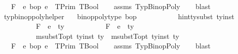 \begin{isabellebody}
\ \ \ {\isachardoublequoteopen}F{\isacharcomma}{\kern0pt}{\isasymDelta}\ {\isasymturnstile}\ e{}\ {\isasymguillemotleft}bop{\isasymguillemotright}\ e{}\ {\isacharcolon}{\kern0pt}\ TPrim\ {\isacharparenleft}{\kern0pt}TBool{\isacharparenright}{\kern0pt}{\isachardoublequoteclose}\isanewline
%
\isadelimproof
\ \ %
\endisadelimproof
%
\isatagproof
{}\isamarkupfalse%
\ assms\ TypBinopPoly\isanewline
\ \ \isamarkupfalse%
\ blast%
\endisatagproof
{\isafoldproof}%
%
\isadelimproof
\isanewline
%
\endisadelimproof
\isanewline
{}\isamarkupfalse%
\ typ{\isacharunderscore}{\kern0pt}binop{\isacharunderscore}{\kern0pt}poly{\isacharunderscore}{\kern0pt}helper{\isacharunderscore}{\kern0pt}{}{\isacharcolon}{\kern0pt}\isanewline
\ \ \ {\isachardoublequoteopen}binop{\isacharunderscore}{\kern0pt}poly{\isacharunderscore}{\kern0pt}type\ bop{\isachardoublequoteclose}\ \isanewline
\ \ \ \ \ \ \ \ \ \ {\isachardoublequoteopen}hint{\isacharunderscore}{\kern0pt}ty{\isacharunderscore}{\kern0pt}subst\ ty{\isacharunderscore}{\kern0pt}inst{\isachardoublequoteclose}\ \isanewline
\ \ \ \ \ \ \ \ \ \ {\isachardoublequoteopen}F{\isacharcomma}{\kern0pt}{\isasymDelta}\ {\isasymturnstile}\ e{}\ {\isacharcolon}{\kern0pt}\ ty{}{\isachardoublequoteclose}\ \isanewline
\ \ \ \ \ \ \ \ \ \ {\isachardoublequoteopen}F{\isacharcomma}{\kern0pt}{\isasymDelta}\ {\isasymturnstile}\ e{}\ {\isacharcolon}{\kern0pt}\ ty{}{\isachardoublequoteclose}\ \ \ \ \ \ \ \ \ \ \ \isanewline
\ \ \ \ \ \ \ \ \ \ {\isachardoublequoteopen}msubstT{\isacharunderscore}{\kern0pt}opt\ ty{\isacharunderscore}{\kern0pt}inst\ ty{}\ {\isacharequal}{\kern0pt}\ msubstT{\isacharunderscore}{\kern0pt}opt\ ty{\isacharunderscore}{\kern0pt}inst\ ty{}{\isachardoublequoteclose}\isanewline
\ \ \ {\isachardoublequoteopen}F{\isacharcomma}{\kern0pt}{\isasymDelta}\ {\isasymturnstile}\ e{}\ {\isasymguillemotleft}bop{\isasymguillemotright}\ e{}\ {\isacharcolon}{\kern0pt}\ TPrim\ {\isacharparenleft}{\kern0pt}TBool{\isacharparenright}{\kern0pt}{\isachardoublequoteclose}\isanewline
%
\isadelimproof
\ \ %
\endisadelimproof
%
\isatagproof
{}\isamarkupfalse%
\ assms\ TypBinopPoly\isanewline
\ \ \isamarkupfalse%
\ blast%
\endisatagproof
{\isafoldproof}%
%
\isadelimproof
\isanewline
%
\endisadelimproof

\end{isabellebody}
